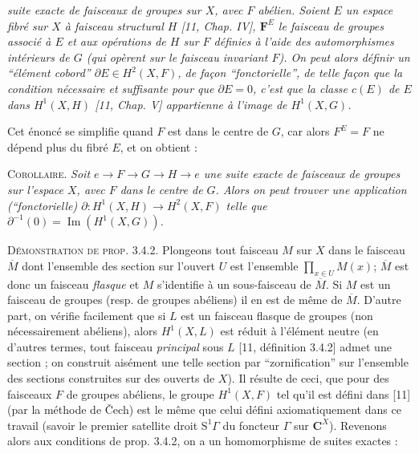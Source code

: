 
\noindent\textit{suite exacte de faisceaux de groupes sur $X$, avec $F$ abélien.
Soient $E$ un espace fibré sur $X$ à faisceau structural $H$ \textup{[11,} Chap. IV\textup{]},
$\mathbf F^E$ le faisceau de groupes associé à $E$ et aux opérations de $H$ sur $F$
définies à l'aide des automorphismes intérieurs de $G$ \textup{(}qui opèrent sur le
faisceau invariant $F$\textup{)}. On peut alors définir un ``élément cobord''
$\partial E\in H^2(X,F)$, de façon ``fonctorielle'', de telle façon que
la condition nécessaire et suffisante pour que $\partial E=0$, c'est que la
classe $c(E)$ de $E$ dans $H^1(X,H)$ \textup{[11,} Chap. V\textup{]} appartienne à l'image de
$H^1(X,G)$.}

Cet énoncé se simplifie quand $F$ est dans le centre de $G$, car alors
$F^E=F$ ne dépend plus du fibré $E$, et on obtient :

\indent\textsc{Corollaire.} \textit{Soit
$e\to F\to G\to H\to e$
une suite exacte de faisceaux de groupes sur l'espace $X$, avec $F$ dans le
centre de $G$. Alors on peut trouver une application \textup{(}``fonctorielle\textup{)}
$\partial:H^1(X,H)\to H^2(X,F)$
telle que $\partial^{-1}(0)=\operatorname{Im}(H^1(X,G))$.}

\indent\textsc{Démonstration de prop. 3.4.2.} Plongeons tout faisceau $M$ sur $X$
dans le faisceau $\overline M$ dont l'ensemble des section sur l'ouvert $U$
est l'ensemble
$\displaystyle\prod_{x\in U}M(x)$;
$\overline M$ est donc un faisceau \textit{flasque} et $M$ s'identifie à un
sous-faisceau de $\overline M$. Si $M$ est un faisceau de groupes (resp. de
groupes abéliens) il en est de même de $\overline M$. D'autre part, on vérifie
facilement que si $L$ est un faisceau flasque de groupes (non nécessairement
abéliens), alors $H^1(X,L)$ est réduit à l'élément neutre (en d'autres termes,
tout faisceau \textit{principal} sous $L$ [11, définition 3.4.2] admet une
section ; on construit aisément une telle section par ``zornification''
sur l'ensemble des sections construites sur des ouverts de $X$).
Il résulte de ceci, que pour des faisceaux $F$ de groupes abéliens, le groupe
$H^1(X,F)$ tel qu'il est défini dans [11] (par la méthode de Čech) est le même
que celui défini axiomatiquement dans ce travail (savoir le premier satellite
droit $\mathrm S^1\Gamma$ du foncteur $\Gamma$ sur $\mathbf C^X$). Revenons alors aux
conditions de prop. 3.4.2, on a un homomorphisme de suites exactes :

